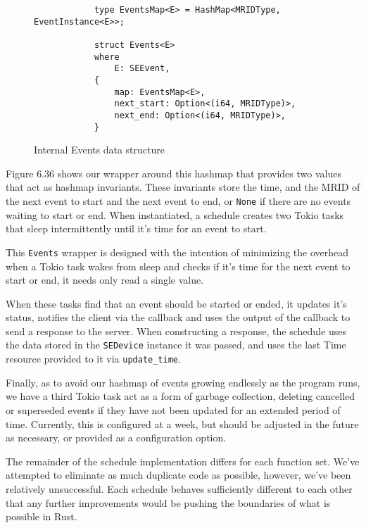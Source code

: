 \begin{figure}[h]
    \begin{center}
        \begin{lstlisting}
            type EventsMap<E> = HashMap<MRIDType, EventInstance<E>>;

            struct Events<E>
            where
                E: SEEvent,
            {
                map: EventsMap<E>,
                next_start: Option<(i64, MRIDType)>,
                next_end: Option<(i64, MRIDType)>,
            }
        \end{lstlisting}
        \label{fig:eventmapimpl}
        \vspace{-10pt}
        \caption{Internal Events data structure}
    \end{center}
\end{figure}

Figure 6.36 shows our wrapper around this hashmap that provides two values that act as hashmap invariants. These invariants store the time, and the MRID of the next event to start and the next event to end, or \texttt{None} if there are no events waiting to start or end. When instantiated, a schedule creates two Tokio tasks that sleep intermittently until it's time for an event to start.

This \texttt{Events} wrapper is designed with the intention of minimizing the overhead when a Tokio task wakes from sleep and checks if it's time for the next event to start or end, it needs only read a single value.

When these tasks find that an event should be started or ended, it updates it's status, notifies the client via the callback and uses the output of the callback to send a response to the server. When constructing a response, the schedule uses the data stored in the \texttt{SEDevice} instance it was passed, and uses the last Time resource provided to it via \texttt{update\_time}.

Finally, as to avoid our hashmap of events growing endlessly as the program runs, we have a third Tokio task act as a form of garbage collection, deleting cancelled or superseded events if they have not been updated for an extended period of time. Currently, this is configured at a week, but should be adjusted in the future as necessary, or provided as a configuration option.

The remainder of the schedule implementation differs for each function set. We've attempted to eliminate as much duplicate code as possible, however, we've been relatively unsuccessful. Each schedule behaves sufficiently different to each other that any further improvements would be pushing the boundaries of what is possible in Rust.

